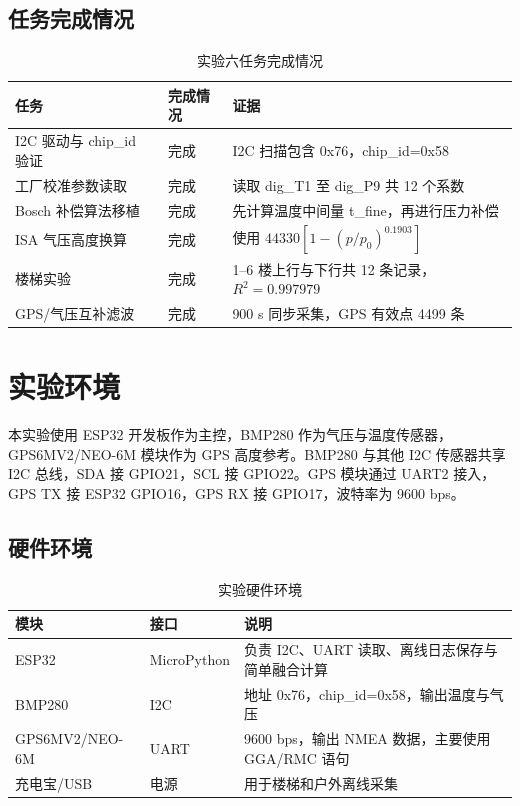 \documentclass[UTF8,a4paper,12pt]{ctexart}
\begin{document}
\subsection{任务完成情况}

\begin{table}[H]
\centering
\caption{实验六任务完成情况}
\begin{tabular}{p{4.2cm}p{3.0cm}p{6.0cm}}
\toprule
任务 & 完成情况 & 证据 \\
\midrule
I2C 驱动与 chip\_id 验证 & 完成 & I2C 扫描包含 0x76，chip\_id=0x58 \\
工厂校准参数读取 & 完成 & 读取 dig\_T1 至 dig\_P9 共 12 个系数 \\
Bosch 补偿算法移植 & 完成 & 先计算温度中间量 t\_fine，再进行压力补偿 \\
ISA 气压高度换算 & 完成 & 使用 $44330[1-(p/p_0)^{0.1903}]$ \\
楼梯实验 & 完成 & 1--6 楼上行与下行共 12 条记录，$R^2=0.997979$ \\
GPS/气压互补滤波 & 完成 & 900 s 同步采集，GPS 有效点 4499 条 \\
\bottomrule
\end{tabular}
\end{table}

\clearpage

\section{实验环境}

本实验使用 ESP32 开发板作为主控，BMP280 作为气压与温度传感器，GPS6MV2/NEO-6M 模块作为 GPS 高度参考。BMP280 与其他 I2C 传感器共享 I2C 总线，SDA 接 GPIO21，SCL 接 GPIO22。GPS 模块通过 UART2 接入，GPS TX 接 ESP32 GPIO16，GPS RX 接 GPIO17，波特率为 9600 bps。

\subsection{硬件环境}

\begin{table}[H]
\centering
\caption{实验硬件环境}
\begin{tabular}{p{3.0cm}p{3.2cm}p{7.0cm}}
\toprule
模块 & 接口 & 说明 \\
\midrule
ESP32 & MicroPython & 负责 I2C、UART 读取、离线日志保存与简单融合计算 \\
BMP280 & I2C & 地址 0x76，chip\_id=0x58，输出温度与气压 \\
GPS6MV2/NEO-6M & UART & 9600 bps，输出 NMEA 数据，主要使用 GGA/RMC 语句 \\
充电宝/USB & 电源 & 用于楼梯和户外离线采集 \\
\bottomrule
\end{tabular}
\end{table}
\end{document}
